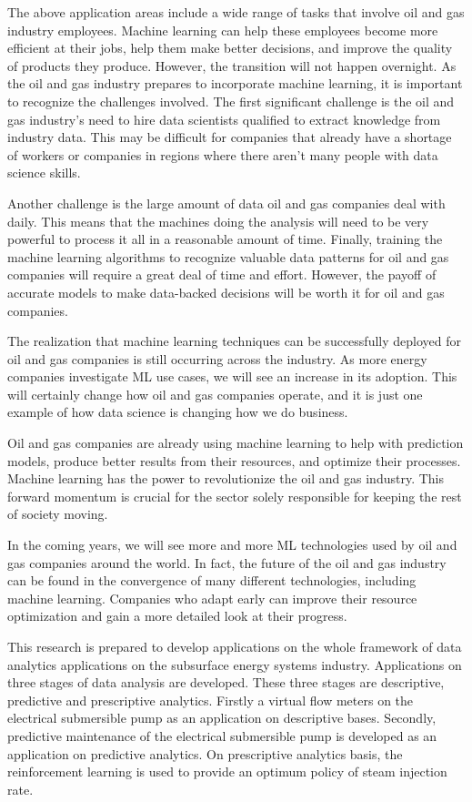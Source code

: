 The above application areas include a wide range of tasks that involve oil and gas industry employees. Machine learning can help these employees become more efficient at their jobs, help them make better decisions, and improve the quality of products they produce. However, the transition will not happen overnight. As the oil and gas industry prepares to incorporate machine learning, it is important to recognize the challenges involved. The first significant challenge is the oil and gas industry’s need to hire data scientists qualified to extract knowledge from industry data. This may be difficult for companies that already have a shortage of workers or companies in regions where there aren’t many people with data science skills. 

Another challenge is the large amount of data oil and gas companies deal with daily. This means that the machines doing the analysis will need to be very powerful to process it all in a reasonable amount of time. Finally, training the machine learning algorithms to recognize valuable data patterns for oil and gas companies will require a great deal of time and effort. However, the payoff of accurate models to make data-backed decisions will be worth it for oil and gas companies.

The realization that machine learning techniques can be successfully deployed for oil and gas companies is still occurring across the industry. As more energy companies investigate ML use cases, we will see an increase in its adoption. This will certainly change how oil and gas companies operate, and it is just one example of how data science is changing how we do business.

Oil and gas companies are already using machine learning to help with prediction models, produce better results from their resources, and optimize their processes. Machine learning has the power to revolutionize the oil and gas industry. This forward momentum is crucial for the sector solely responsible for keeping the rest of society moving.

In the coming years, we will see more and more ML technologies used by oil and gas companies around the world. In fact, the future of the oil and gas industry can be found in the convergence of many different technologies, including machine learning. Companies who adapt early can improve their resource optimization and gain a more detailed look at their progress.


This research is prepared to develop applications on the whole framework of data analytics applications on the subsurface energy systems industry. Applications on three stages of data analysis are developed. These three stages are descriptive, predictive and prescriptive analytics. Firstly a virtual flow meters on the electrical submersible pump as an application on descriptive bases. Secondly, predictive maintenance of the electrical submersible pump is developed as an application on predictive analytics. On prescriptive analytics basis, the reinforcement learning is used to provide an optimum policy of steam injection rate.

